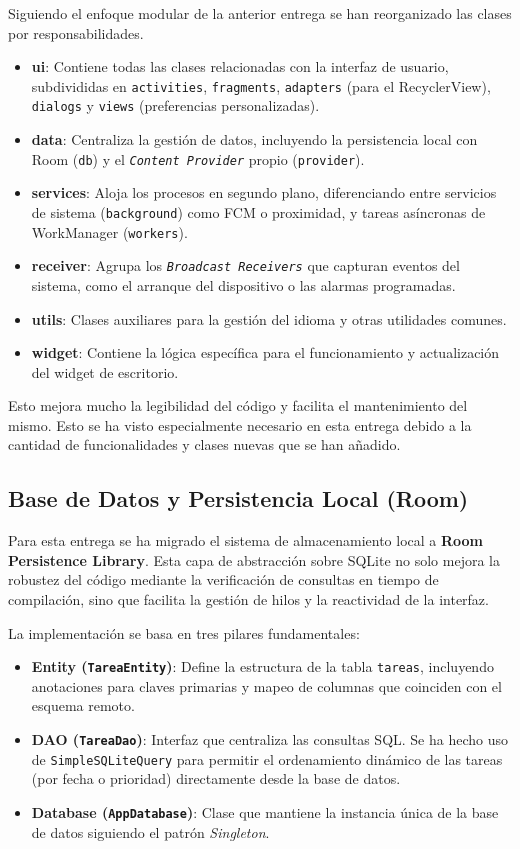 \documentclass{article}
\begin{document}
Siguiendo el enfoque modular de la anterior entrega se han reorganizado las clases por responsabilidades.

\begin{itemize}
    \item \textbf{ui}: Contiene todas las clases relacionadas con la interfaz de usuario, subdivididas en \texttt{activities}, \texttt{fragments}, \texttt{adapters} (para el RecyclerView), \texttt{dialogs} y \texttt{views} (preferencias personalizadas).
    \item \textbf{data}: Centraliza la gestión de datos, incluyendo la persistencia local con Room (\texttt{db}) y el \texttt{\textit{Content Provider}} propio (\texttt{provider}).
    \item \textbf{services}: Aloja los procesos en segundo plano, diferenciando entre servicios de sistema (\texttt{background}) como FCM o proximidad, y tareas asíncronas de WorkManager (\texttt{workers}).
    \item \textbf{receiver}: Agrupa los \texttt{\textit{Broadcast Receivers}} que capturan eventos del sistema, como el arranque del dispositivo o las alarmas programadas.
    \item \textbf{utils}: Clases auxiliares para la gestión del idioma y otras utilidades comunes.
    \item \textbf{widget}: Contiene la lógica específica para el funcionamiento y actualización del widget de escritorio.
\end{itemize}

Esto mejora mucho la legibilidad del código y facilita el mantenimiento del mismo. Esto se ha visto especialmente necesario en esta entrega debido a la cantidad de funcionalidades y clases nuevas que se han añadido.

\subsection{Base de Datos y Persistencia Local (Room)}

Para esta entrega se ha migrado el sistema de almacenamiento local a \textbf{Room Persistence Library}. Esta capa de abstracción sobre SQLite no solo mejora la robustez del código mediante la verificación de consultas en tiempo de compilación, sino que facilita la gestión de hilos y la reactividad de la interfaz.

La implementación se basa en tres pilares fundamentales:
\begin{itemize}
    \item \textbf{Entity (\texttt{TareaEntity})}: Define la estructura de la tabla \texttt{tareas}, incluyendo anotaciones para claves primarias y mapeo de columnas que coinciden con el esquema remoto.
    \item \textbf{DAO (\texttt{TareaDao})}: Interfaz que centraliza las consultas SQL. Se ha hecho uso de \texttt{SimpleSQLiteQuery} para permitir el ordenamiento dinámico de las tareas (por fecha o prioridad) directamente desde la base de datos.
    \item \textbf{Database (\texttt{AppDatabase})}: Clase que mantiene la instancia única de la base de datos siguiendo el patrón \textit{Singleton}.
\end{itemize}
\end{document}
